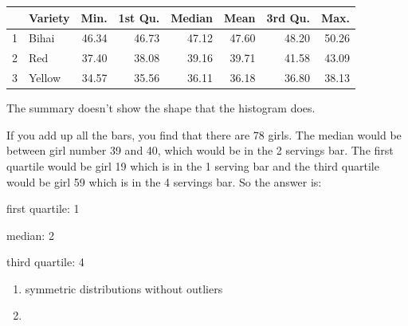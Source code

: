 \documentclass[letterpaper, landscape]{exam}
\begin{document}
\begin{description}
        \begin{table}[H]
          \centering
          \begin{tabular}{rlrrrrrr}
            \toprule
              & Variety & Min.  & 1st Qu. & Median & Mean  & 3rd Qu. & Max. \\
            \midrule
            1 & Bihai   & 46.34 & 46.73   & 47.12  & 47.60 & 48.20   & 50.26 \\
            2 & Red     & 37.40 & 38.08   & 39.16  & 39.71 & 41.58   & 43.09 \\
            3 & Yellow  & 34.57 & 35.56   & 36.11  & 36.18 & 36.80   & 38.13 \\
            \bottomrule
          \end{tabular}
        \end{table}

        The summary doesn't show the shape that the histogram does.

      \newpage

      \item[30]
        If you add up all the bars, you find that there are 78 girls.  The
        median would be between girl number 39 and 40, which would be in the 2
        servings bar.  The first quartile would be girl 19 which is in the 1
        serving bar and the third quartile would be girl 59 which is in the 4
        servings bar.  So the answer is:

        \begin{itemize*}
          \item first quartile: 1
          \item median: 2
          \item third quartile: 4
        \end{itemize*}
        
      \item[32]
        \begin{enumerate}[a]
          \item symmetric distributions without outliers

          \item 


\end{enumerate}
\end{description}
\end{document}
